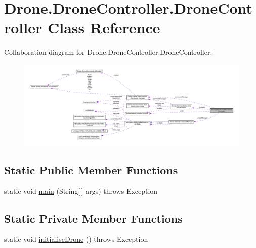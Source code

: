 \hypertarget{class_drone_1_1_drone_controller_1_1_drone_controller}{}\section{Drone.\+Drone\+Controller.\+Drone\+Controller Class Reference}
\label{class_drone_1_1_drone_controller_1_1_drone_controller}


Collaboration diagram for Drone.\+Drone\+Controller.\+Drone\+Controller\+:\nopagebreak
\begin{figure}[H]
\begin{center}
\leavevmode
\includegraphics[width=350pt]{class_drone_1_1_drone_controller_1_1_drone_controller__coll__graph}
\end{center}
\end{figure}
\subsection*{Static Public Member Functions}
\begin{DoxyCompactItemize}
\item 
static void \hyperlink{class_drone_1_1_drone_controller_1_1_drone_controller_ac7542dd428ccd58fcb2431e4b8db9dc4}{main} (String\mbox{[}$\,$\mbox{]} args)  throws Exception 	
\end{DoxyCompactItemize}
\subsection*{Static Private Member Functions}
\begin{DoxyCompactItemize}
\item 
static void \hyperlink{class_drone_1_1_drone_controller_1_1_drone_controller_a83ead59dd788c4898761ab3a7b3f9099}{initialise\+Drone} ()  throws Exception 	
\end{DoxyCompactItemize}
